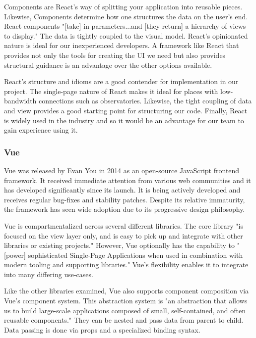 \documentclass[12pt]{report}
\begin{document}
Components are React's way of splitting your application into reusable pieces. Likewise, Components determine how one structures the data on the user's end. React components "[take] in parameters...and [they return] a hierarchy of views to display."\cite{reacttutorial} The data is tightly coupled to the visual model. React's opinionated nature is ideal for our inexperienced developers. A framework like React that provides not only the tools for creating the UI we need but also provides structural guidance is an advantage over the other options available.

React's structure and idioms are a good contender for implementation in our project. The single-page nature of React makes it ideal for places with low-bandwidth connections such as observatories. Likewise, the tight coupling of data and view provides a good starting point for structuring our code. Finally, React is widely used in the industry and so it would be an advantage for our team to gain experience using it.

\subsubsection*{Vue}

Vue was released by Evan You in 2014 as an open-source JavaScript frontend framework.\cite{vuelaunch} It received immediate attention from various web communities and it has developed significantly since its launch. It is being actively developed and receives regular bug-fixes and stability patches. Despite its relative immaturity, the framework has seen wide adoption due to its progressive design philosophy.

Vue is compartmentalized across several different libraries. The core library "is focused on the view layer only, and is easy to pick up and integrate with other libraries or existing projects." \cite{vueguide} However, Vue optionally has the capability to "[power] sophisticated Single-Page Applications when used in combination with modern tooling and supporting libraries."\cite{vueguide} Vue's flexibility enables it to integrate into many differing use-cases.

Like the other libraries examined, Vue also supports component composition via Vue's component system. This abstraction system is "an abstraction that allows us to build large-scale applications composed of small, self-contained, and often reusable components."\cite{vueguide} They can be nested and pass data from parent to child. Data passing is done via props and a specialized binding syntax.
\end{document}
